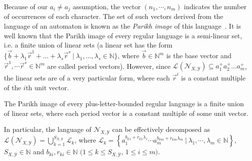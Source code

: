 \documentclass{lmcs}
\theoremstyle{plain}
\theoremstyle{definition}
\theoremstyle{remark}
\newcommand\lng[2]{\mathcal{L}_{#1}(#2)}
\newcommand\chr{a}
\newcommand\basevecraw{b}
\newcommand\basevec{\vec{\basevecraw}}
\newcommand\pvecraw{r}
\begin{document}
Because of our $a_i\neq a_{j}$ assumption, the vector $(n_1,\cdots,n_m)$ indicates the number of occurrences of each character.
The set of such vectors derived from the language of an automaton  is known  as the \emph{Parikh image} of this language~\cite{parikh1966context}.
It is  well known that the Parikh image of every regular language is a semi-linear set, i.e. a finite union of linear sets
(a linear set  has the form $\{\basevec+\lambda_1\vec{r}^1 + \dots + \lambda_s \vec{r}^s\ |\   \lambda_1,\dots,\lambda_s \in \mathbb{N} \}$,
where $\basevec \in \mathbb{N}^m$ is the base vector and $\vec{r}^1,\cdots \vec{r}^s\in\mathbb{N}^m$ are called period vectors).
However, since $\lng{}{\mathcal{N}_{X,\mathcal{Y}}} \subseteq \chr_1^+\chr_2^+\dots \chr_m^+$,
the linear sets are of a very particular form,  where each $\vec{r}^i$ is a constant multiple of the $i$th unit vector.

\begin{lem}\label{claim:finiteunion}
The Parikh image of every plus-letter-bounded regular language
is a finite union of linear sets, where each period vector is a constant
multiple of some unit vector.

In particular,
the language of $\mathcal{N}_{X,\mathcal{Y}}$ can be effectively decomposed as $\lng{}{\mathcal{N}_{X,\mathcal{Y}}} = \bigcup\nolimits_{k = 1}^{S_{X,\mathcal{Y}}}\mathcal{L}_k$,
where
$\mathcal{L}_k = \left\{ \chr_1^{\basevecraw_{k1}+ \pvecraw_{k1}\lambda_1}\cdots \chr_m^{\basevecraw_{km}+\pvecraw_{km}\lambda_m } \ | \ \lambda_1,\cdots,\lambda_m\in\mathbb{N}\right\}$, $S_{X,\mathcal{Y}}\in\mathbb{N}$ and  $b_{ki},r_{ki}\in\mathbb{N}$  $(1\le k \le S_{X,\mathcal{Y}}$, $1\le i \le m)$.
\end{lem}
\end{document}
